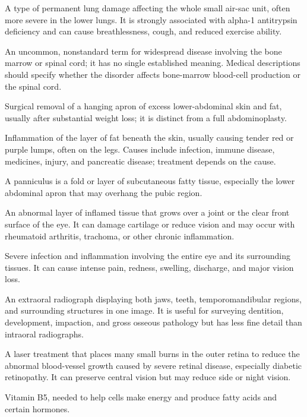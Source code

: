  A type of permanent lung damage affecting the whole small air-sac unit, often more severe in the lower lungs. It is strongly associated with alpha-1 antitrypsin deficiency and can cause breathlessness, cough, and reduced exercise ability.

 An uncommon, nonstandard term for widespread disease involving the bone marrow or spinal cord; it has no single established meaning. Medical descriptions should specify whether the disorder affects bone-marrow blood-cell production or the spinal cord.

 Surgical removal of a hanging apron of excess lower-abdominal skin and fat, usually after substantial weight loss; it is distinct from a full abdominoplasty.

 Inflammation of the layer of fat beneath the skin, usually causing tender red or purple lumps, often on the legs. Causes include infection, immune disease, medicines, injury, and pancreatic disease; treatment depends on the cause.

 A panniculus is a fold or layer of subcutaneous fatty tissue, especially the lower abdominal apron that may overhang the pubic region.

 An abnormal layer of inflamed tissue that grows over a joint or the clear front surface of the eye. It can damage cartilage or reduce vision and may occur with rheumatoid arthritis, trachoma, or other chronic inflammation.

 Severe infection and inflammation involving the entire eye and its surrounding tissues. It can cause intense pain, redness, swelling, discharge, and major vision loss.

 An extraoral radiograph displaying both jaws, teeth, temporomandibular regions, and
surrounding structures in one image. It is useful for surveying dentition, development,
impaction, and gross osseous pathology but has less fine detail than intraoral
radiographs.

 A laser treatment that places many small burns in the outer retina to reduce the abnormal blood-vessel growth caused by severe retinal disease, especially diabetic retinopathy. It can preserve central vision but may reduce side or night vision.

 Vitamin B5, needed to help cells make energy and produce fatty acids and certain hormones.

